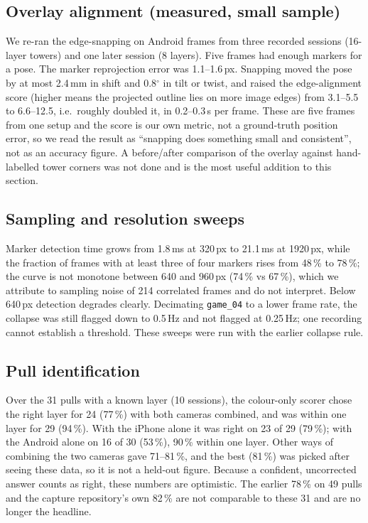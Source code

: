 \documentclass[conference,10pt]{IEEEtran}
\newcommand{\code}[1]{\texttt{\small #1}}
\begin{document}
\subsection{Overlay alignment (measured, small sample)}
We re-ran the edge-snapping on Android frames from three recorded sessions (16-layer towers) and one later session (8 layers). Five frames had enough markers for a pose. The marker reprojection error was 1.1--1.6\,px. Snapping moved the pose by at most 2.4\,mm in shift and 0.8$^\circ$ in tilt or twist, and raised the edge-alignment score (higher means the projected outline lies on more image edges) from 3.1--5.5 to 6.6--12.5, i.e.\ roughly doubled it, in 0.2--0.3\,s per frame. These are five frames from one setup and the score is our own metric, not a ground-truth position error, so we read the result as ``snapping does something small and consistent'', not as an accuracy figure. A before/after comparison of the overlay against hand-labelled tower corners was not done and is the most useful addition to this section.
\subsection{Sampling and resolution sweeps}
Marker detection time grows from 1.8\,ms at 320\,px to 21.1\,ms at 1920\,px, while the fraction of frames with at least three of four markers rises from 48\,\% to 78\,\%; the curve is not monotone between 640 and 960\,px (74\,\% vs 67\,\%), which we attribute to sampling noise of 214 correlated frames and do not interpret. Below 640\,px detection degrades clearly. Decimating \code{game\_04} to a lower frame rate, the collapse was still flagged down to 0.5\,Hz and not flagged at 0.25\,Hz; one recording cannot establish a threshold. These sweeps were run with the earlier collapse rule.
\subsection{Pull identification}
Over the 31 pulls with a known layer (10 sessions), the colour-only scorer chose the right layer for 24 (77\,\%) with both cameras combined, and was within one layer for 29 (94\,\%). With the iPhone alone it was right on 23 of 29 (79\,\%); with the Android alone on 16 of 30 (53\,\%), 90\,\% within one layer. Other ways of combining the two cameras gave 71--81\,\%, and the best (81\,\%) was picked after seeing these data, so it is not a held-out figure. Because a confident, uncorrected answer counts as right, these numbers are optimistic. The earlier 78\,\% on 49 pulls and the capture repository's own 82\,\% are not comparable to these 31 and are no longer the headline.
\end{document}
